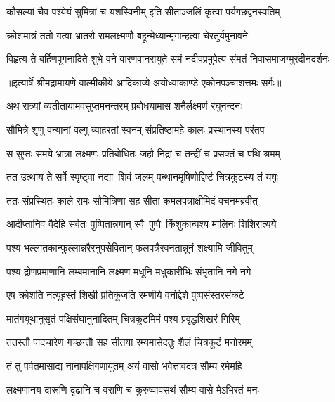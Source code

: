 \twolineshloka
{कौसल्यां चैव पश्येयं सुमित्रां च यशस्विनीम्}
{इति सीताञ्जलिं कृत्वा पर्यगछद्वनस्पतिम्} %

\twolineshloka
{क्रोशमात्रं ततो गत्वा भ्रातरौ रामलक्ष्मणौ}
{बहून्मेध्यान्मृगान्हत्वा चेरतुर्यमुनावने} %

\fourlineindentedshloka
{विहृत्य ते बर्हिणपूगनादिते}
{ शुभे वने वारणवानरायुते}
{समं नदीवप्रमुपेत्य संमतं}
{ निवासमाजग्मुरदीनदर्शनः} %


{॥इत्यार्षे श्रीमद्रामायणे वाल्मीकीये आदिकाव्ये अयोध्याकाण्डे एकोनपञ्चाशत्तमः सर्गः॥}


\twolineshloka
{अथ रात्र्यां व्यतीतायामवसुप्तमनन्तरम्}
{प्रबोधयामास शनैर्लक्ष्मणं रघुनन्दनः} %

\twolineshloka
{सौमित्रे शृणु वन्यानां वल्गु व्याहरतां स्वनम्}
{संप्रतिष्ठामहे कालः प्रस्थानस्य परंतप} %

\twolineshloka
{स सुप्तः समये भ्रात्रा लक्ष्मणः प्रतिबोधितः}
{जहौ निद्रां च तन्द्रीं च प्रसक्तं च पथि श्रमम्} %

\twolineshloka
{तत उत्थाय ते सर्वे स्पृष्ट्वा नद्याः शिवं जलम्}
{पन्थानमृषिणोद्दिष्टं चित्रकूटस्य तं ययुः} %

\twolineshloka
{ततः संप्रस्थितः काले रामः सौमित्रिणा सह}
{सीतां कमलपत्राक्षीमिदं वचनमब्रवीत्} %

\twolineshloka
{आदीप्तानिव वैदेहि सर्वतः पुष्पितान्नगान्}
{स्वैः पुष्पैः किंशुकान्पश्य मालिनः शिशिरात्यये} %

\twolineshloka
{पश्य भल्लातकान्फुल्लान्नरैरनुपसेवितान्}
{फलपत्रैरवनतान्नूनं शक्ष्यामि जीवितुम्} %

\twolineshloka
{पश्य द्रोणप्रमाणानि लम्बमानानि लक्ष्मण}
{मधूनि मधुकारीभिः संभृतानि नगे नगे} %

\twolineshloka
{एष क्रोशति नत्यूहस्तं शिखी प्रतिकूजति}
{रमणीये वनोद्देशे पुष्पसंस्तरसंकटे} %

\twolineshloka
{मातंगयूथानुसृतं पक्षिसंघानुनादितम्}
{चित्रकूटमिमं पश्य प्रवृद्धशिखरं गिरिम्} %

\twolineshloka
{ततस्तौ पादचारेण गच्छन्तौ सह सीतया}
{रम्यमासेदतुः शैलं चित्रकूटं मनोरमम्} %

\twolineshloka
{तं तु पर्वतमासाद्य नानापक्षिगणायुतम्}
{अयं वासो भवेत्तावदत्र सौम्य रमेमहि} %

\twolineshloka
{लक्ष्मणानय दारूणि दृढानि च वराणि च}
{कुरुष्वावसथं सौम्य वासे मेऽभिरतं मनः} %

